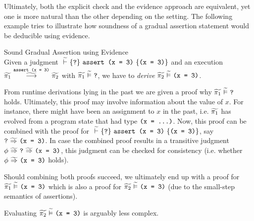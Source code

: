 Ultimately, both the explicit check and the evidence approach are equivalent, yet one is more natural than the other depending on the setting.
The following example tries to illustrate how soundness of a gradual assertion statement would be deducible using evidence.
\begin{example}{Sound Gradual Assertion using Evidence}\label{ex:snd-evidence}~\\
    Given a judgment $\gthoare{}{\qm}{\sAssert{\phiEq{x}{3}}}{\phiEq{x}{3}}$ and an execution $\gsstepConsume{\sAssert{\phiEq{x}{3}}}{\grad{\pi_1}}{\grad{\pi_2}}$ with $\evalgphiGen{\grad{\pi_1}}{\qm}$, we have to \emph{derive} $\evalgphiGen{\grad{\pi_2}}{\phiEq{x}{3}}$.
    
    From runtime derivations lying in the past we are given a proof why $\evalgphiGen{\grad{\pi_1}}{\qm}$ holds.
    Ultimately, this proof may involve information about the value of $x$.
    For instance, there might have been an assignment to $x$ in the past, i.e. $\grad{\pi_1}$ has evolved from a program state that had type $\phiEq{x}{...}$.
    Now, this proof can be combined with the proof for $\gthoare{}{\qm}{\sAssert{\phiEq{x}{3}}}{\phiEq{x}{3}}$, say $\gphiImplies{\qm}{\phiEq{x}{3}}$.
    In case the combined proof results in a transitive judgment $\gphiImplies{\phi}{\gphiImplies{\qm}{\phiEq{x}{3}}}$, this judgment can be checked for consistency (i.e. whether $\gphiImplies{\phi}{\phiEq{x}{3}}$ holds).
    
    Should combining both proofs succeed, we ultimately end up with a proof for $\evalgphiGen{\grad{\pi_1}}{\phiEq{x}{3}}$ which is also a proof for $\evalgphiGen{\grad{\pi_2}}{\phiEq{x}{3}}$ (due to the small-step semantics of assertions).
    
    Evaluating $\evalgphiGen{\grad{\pi_2}}{\phiEq{x}{3}}$ is arguably less complex.
    \begin{comment}
    Note also that the assertion example above is a very simple case. In general, it might be required to show consistency of more complex proofs, e.g. by proving that $$\gphiImplies{\phiAnd{$(\phiAnd{$(\wo{\phi}{\eresult})$}{\phiEq{\eresult}{\ethis}})[\ttt{x},\ttt{y}/\eresult,\ethis]$}{\phiEq{x}{p}}}{\phiEq{y}{p}}$$
    holds given $$\gphiImplies{\phiAnd{$(\phiAnd{$(\wo{\phi}{\eresult})$}{\phiEq{\eresult}{\ethis}})[\ttt{x},\ttt{y}/\eresult,\ethis]$}{\phiEq{x}{p}}}{\phiEq{y}{p}}$$
    , which requires evidence sophisticated enough to model the program environment.
    \end{comment}
\end{example}

